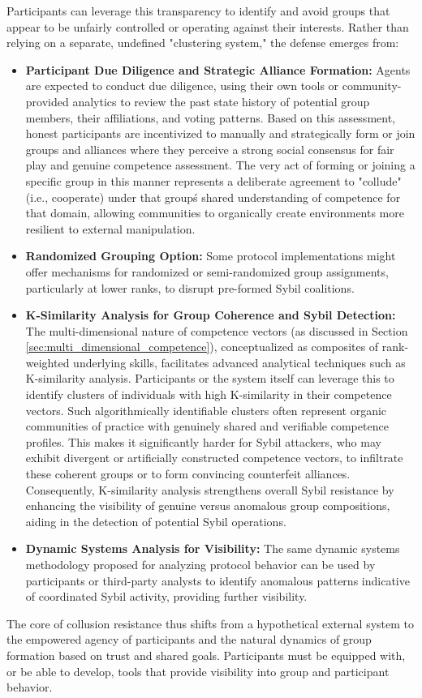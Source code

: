 \documentclass{article}
\begin{document}
\begin{CJK}{UTF8}{gbsn}
            {{Participants can leverage this transparency to identify and avoid groups that appear to be unfairly controlled or operating against their interests. Rather than relying on a separate, undefined "clustering system," the defense emerges from:}}
        \begin{itemize}
            \item \textbf{Participant Due Diligence and Strategic Alliance Formation:} Agents are expected to conduct due diligence, using their own tools or community-provided analytics to review the past state history of potential group members, their affiliations, and voting patterns. Based on this assessment, honest participants are incentivized to manually and strategically form or join groups and alliances where they perceive a strong social consensus for fair play and genuine competence assessment. The very act of forming or joining a specific group in this manner represents a deliberate agreement to "collude" (i.e., cooperate) under that group\'s shared understanding of competence for that domain, allowing communities to organically create environments more resilient to external manipulation.
            \item \textbf{Randomized Grouping Option:} Some protocol implementations might offer mechanisms for randomized or semi-randomized group assignments, particularly at lower ranks, to disrupt pre-formed Sybil coalitions.
            \item \textbf{K-Similarity Analysis for Group Coherence and Sybil Detection:} The multi-dimensional nature of competence vectors (as discussed in Section \ref{sec:multi_dimensional_competence}), conceptualized as composites of rank-weighted underlying skills, facilitates advanced analytical techniques such as K-similarity analysis. Participants or the system itself can leverage this to identify clusters of individuals with high K-similarity in their competence vectors. Such algorithmically identifiable clusters often represent organic communities of practice with genuinely shared and verifiable competence profiles. This makes it significantly harder for Sybil attackers, who may exhibit divergent or artificially constructed competence vectors, to infiltrate these coherent groups or to form convincing counterfeit alliances. Consequently, K-similarity analysis strengthens overall Sybil resistance by enhancing the visibility of genuine versus anomalous group compositions, aiding in the detection of potential Sybil operations.
            \item \textbf{Dynamic Systems Analysis for Visibility:} The same dynamic systems methodology proposed for analyzing protocol behavior can be used by participants or third-party analysts to identify anomalous patterns indicative of coordinated Sybil activity, providing further visibility.
        \end{itemize}
        {{The core of collusion resistance thus shifts from a hypothetical external system to the empowered agency of participants and the natural dynamics of group formation based on trust and shared goals. Participants must be equipped with, or be able to develop, tools that provide visibility into group and participant behavior.}}


\end{CJK}
\end{document}
